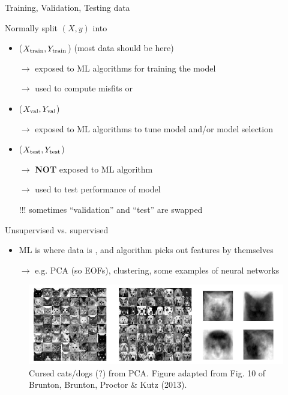 \documentclass[xcolor=x11names,compress]{beamer}
\renewcommand{\(}{\begin{columns}}
\renewcommand{\)}{\end{columns}}
\newcommand{\<}[1]{\begin{column}{#1}}
\renewcommand{\>}{\end{column}}
\begin{document}

\begin{frame}{Training, Validation, Testing data}

Normally split $(X, y)$ into
\begin{itemize}
  \item {} ($X_{\rm train}, Y_{\rm train}$) {\tiny (most
  data should be here)}
  \item[] $\to$ exposed to ML algorithms for training the model
  \item[] $\to$ used to compute misfits or 
  \item {} ($X_{\rm val}, Y_{\rm val}$)
  \item[] $\to$ exposed to ML algorithms to tune model
   and/or model selection
  \item {} ($X_{\rm test}, Y_{\rm test}$)
  \item[] $\to$ \textbf{NOT} exposed to ML algorithm
  \item[] $\to$ used to test performance of model
  \item[]
  \item[!!!] sometimes ``validation'' and ``test'' are swapped
\end{itemize}

\end{frame}


\begin{frame}{Unsupervised vs. supervised}

\begin{itemize}
  \item {} ML is where data is , and
  algorithm picks out features by themselves
  \item[] $\to$ e.g. PCA (so EOFs), clustering, some examples of neural networks
\end{itemize}

\begin{figure}
  \includegraphics[width=\textwidth]{brunton_et_al_2013}
  \caption{Cursed cats/dogs (?) from PCA. Figure adapted from Fig. 10 of
  Brunton, Brunton, Proctor \& Kutz (2013).}
\end{figure}

\end{frame}
\end{document}
